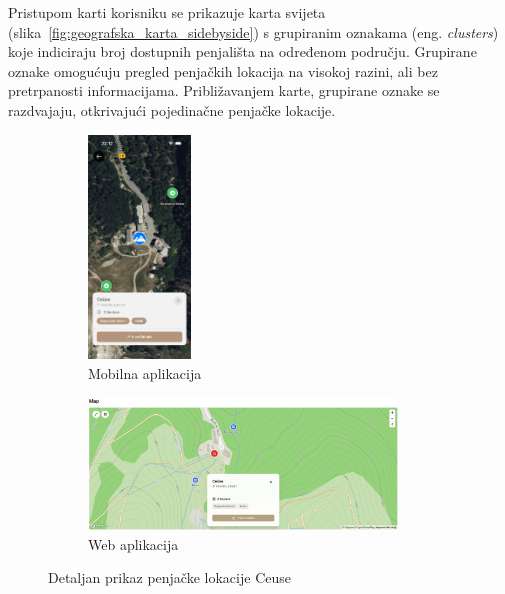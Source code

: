 Pristupom karti korisniku se prikazuje karta svijeta (slika~\ref{fig:geografska_karta_sidebyside}) s grupiranim oznakama (eng. \textit{clusters}) koje indiciraju broj dostupnih penjališta na određenom području. Grupirane oznake omogućuju pregled penjačkih lokacija na visokoj razini, ali bez pretrpanosti informacijama. Približavanjem karte, grupirane oznake se razdvajaju, otkrivajući pojedinačne penjačke lokacije.

\begin{figure}[H]
    \centering
    \begin{subfigure}[b]{\textwidth}
        \centering
        \includegraphics[width=0.3\textwidth]{images/implementacija/geo_karta_ceuse.png}
        \caption{Mobilna aplikacija}
        \label{fig:geografska_karta_ceuse_mob}
    \end{subfigure}
    \hfill
    \begin{subfigure}[b]{\textwidth}
        \centering
        \includegraphics[width=0.9\textwidth]{images/implementacija/web/map_selected.png}
        \caption{Web aplikacija}
        \label{fig:geografska_karta_ceuse_web}
    \end{subfigure}
    \caption{Detaljan prikaz penjačke lokacije Ceuse}
    \label{fig:geografska_karta_ceuse_sidebyside}
\end{figure}

